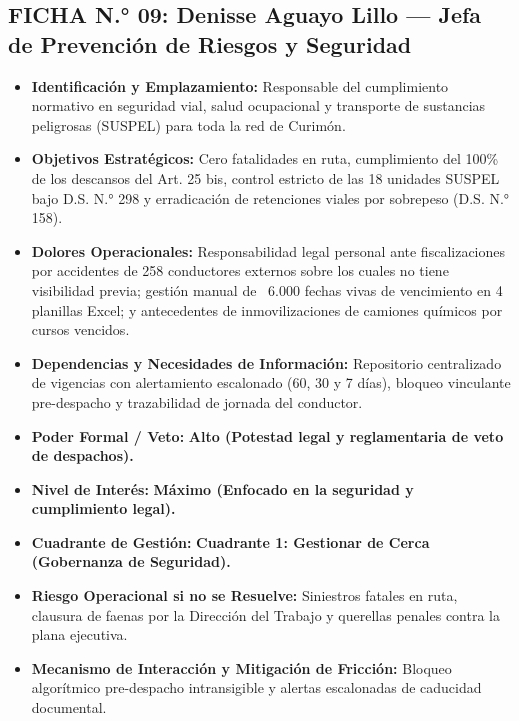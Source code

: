 \subsection*{FICHA N.° 09: Denisse Aguayo Lillo — Jefa de Prevención de Riesgos y Seguridad}
\begin{itemize}
\item \textbf{Identificación y Emplazamiento:} Responsable del cumplimiento normativo en seguridad vial, salud ocupacional y transporte de sustancias peligrosas (SUSPEL) para toda la red de Curimón.
\item \textbf{Objetivos Estratégicos:} Cero fatalidades en ruta, cumplimiento del 100\% de los descansos del Art. 25 bis, control estricto de las 18 unidades SUSPEL bajo D.S. N.° 298 y erradicación de retenciones viales por sobrepeso (D.S. N.° 158).
\item \textbf{Dolores Operacionales:} Responsabilidad legal personal ante fiscalizaciones por accidentes de 258 conductores externos sobre los cuales no tiene visibilidad previa; gestión manual de ~6.000 fechas vivas de vencimiento en 4 planillas Excel; y antecedentes de inmovilizaciones de camiones químicos por cursos vencidos.
\item \textbf{Dependencias y Necesidades de Información:} Repositorio centralizado de vigencias con alertamiento escalonado (60, 30 y 7 días), bloqueo vinculante pre-despacho y trazabilidad de jornada del conductor.
\item \textbf{Poder Formal / Veto:} \textbf{Alto (Potestad legal y reglamentaria de veto de despachos).}
\item \textbf{Nivel de Interés:} \textbf{Máximo (Enfocado en la seguridad y cumplimiento legal).}
\item \textbf{Cuadrante de Gestión:} \textbf{Cuadrante 1: Gestionar de Cerca (Gobernanza de Seguridad).}
\item \textbf{Riesgo Operacional si no se Resuelve:} Siniestros fatales en ruta, clausura de faenas por la Dirección del Trabajo y querellas penales contra la plana ejecutiva.
\item \textbf{Mecanismo de Interacción y Mitigación de Fricción:} Bloqueo algorítmico pre-despacho intransigible y alertas escalonadas de caducidad documental.
\end{itemize}
